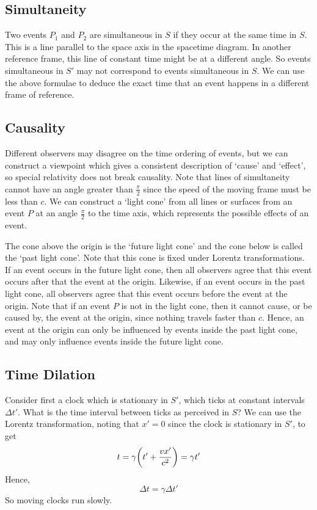 \documentclass{article}
\begin{document}
\subsection{Simultaneity}
Two events $P_1$ and $P_2$ are simultaneous in $S$ if they occur at the same time in $S$. This is a line parallel to the space axis in the spacetime diagram. In another reference frame, this line of constant time might be at a different angle. So events simultaneous in $S'$ may not correspond to events simultaneous in $S$. We can use the above formulae to deduce the exact time that an event happens in a different frame of reference.

\subsection{Causality}
Different observers may disagree on the time ordering of events, but we can construct a viewpoint which gives a consistent description of `cause' and `effect', so special relativity does not break causality. Note that lines of simultaneity cannot have an angle greater than $\frac{\pi}{2}$ since the speed of the moving frame must be less than $c$. We can construct a `light cone' from all lines or surfaces from an event $P$ at an angle $\frac{\pi}{2}$ to the time axis, which represents the possible effects of an event.
\begin{center}
\end{center}
The cone above the origin is the `future light cone' and the cone below is called the `past light cone'. Note that this cone is fixed under Lorentz transformations. If an event occurs in the future light cone, then all observers agree that this event occurs after that the event at the origin. Likewise, if an event occurs in the past light cone, all observers agree that this event occurs before the event at the origin. Note that if an event $P$ is not in the light cone, then it cannot cause, or be caused by, the event at the origin, since nothing travels faster than $c$. Hence, an event at the origin can only be influenced by events inside the past light cone, and may only influence events inside the future light cone.

\subsection{Time Dilation}
Consider first a clock which is stationary in $S'$, which ticks at constant intervals $\Delta t'$. What is the time interval between ticks as perceived in $S$? We can use the Lorentz transformation, noting that $x'=0$ since the clock is stationary in $S'$, to get
\[ t = \gamma\qty(t' + \frac{vx'}{c^2}) = \gamma t' \]
Hence,
\[ \Delta t = \gamma \Delta t' \]
So moving clocks run slowly.
\end{document}
